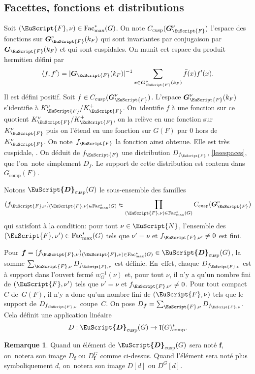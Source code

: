 \documentclass[JEP,XML,SOM,Unicode,francais]{cedram}
\let\mathcal \EuScript
\let\<\langle
\let\>\rangle
\newcommand{\comp}{\mathrm{comp}}
\newcommand{\cusp}{\mathrm{cusp}}
\newcommand{\Fac}{\mathrm{Fac}}
\DeclareMathOperator{\rI}{I}
\newcommand{\bmf}{\boldsymbol{f}}
\newcommand{\bG}{\boldsymbol{G}}
\newcommand{\cD}{\mathcal{D}}
\newcommand{\cF}{\mathcal{F}}
\newcommand{\cN}{\mathcal{N}}
\theoremstyle{plain}
\theoremstyle{definition}
\newtheorem*{rem*}{Remarque}
\begin{document}
\subsection{Facettes, fonctions et distributions}\label{facettesfonctions}
Soit $(\cF,\nu)\in \Fac_{\max}^*(G)$. On note $C_{\cusp}(\bG^{\nu}_{\cF})$ l'espace des fonctions sur $\bG^{\nu}_{\cF}(k_{F})$ qui sont invariantes par conjugaison par $\bG_{\cF}(k_{F})$ et qui sont cuspidales. On munit cet espace du produit hermitien défini par
\[
\<f,f'\>=\vert \bG_{\cF}(k_{F})\vert ^{-1}\sum_{x\in \bG^{\nu}_{\cF}(k_{F})}\bar{f}(x)f'(x).
\]
Il est défini positif. Soit $f\in C_{\cusp}(\bG^{\nu}_{\cF})$. L'espace $\bG_{\cF}^{\nu}(k_{F})$ s'identifie à $K_{\cF}^{\nu}/K_{\cF}^+$. On~identifie $f$ à une fonction sur ce quotient $K_{\cF}^{\nu}/K_{\cF}^+$, on la relève en une fonction sur~$K_{\cF}^{\nu}$ puis on l'étend en une fonction sur $G(F)$ par $0$ hors de $K_{\cF}^{\nu}$. On note~$f_{\cF}$ la fonction ainsi obtenue. Elle est très cuspidale, \cf \cite[Lem.\,10]{W2}. On déduit de $f_{\cF}$ une distribution $D_{f_{\cF}}$, \cf \ref{lesespaces}, que l'on~note simplement $D_{f}$. Le support de cette distribution est contenu dans $G_{\comp}(F)$.

Notons $\boldsymbol{\cD}_{\cusp}(G)$ le sous-ensemble des familles
\[
(f_{\cF,\nu})_{(\cF,\nu)\in \Fac^*_{\max}(G)}\in \prod_{(\cF,\nu)\in \Fac^*_{\max}(G)}C_{\cusp}(\bG^{\nu}_{\cF})
\]
qui satisfont à la condition: pour tout $\nu\in \cN$, l'ensemble des $(\cF,\nu')\in \Fac^*_{\max}(G)$ tels que $\nu'=\nu$ et $f_{\cF,\nu'}\neq0$ est fini.

Pour $\bmf=(f_{\cF,\nu})_{(\cF,\nu)\in \Fac^*_{\max}(G)}\in \boldsymbol{\cD}_{\cusp}(G)$, la somme $\sum_{\cF,\nu}D_{f_{\cF,\nu}}$ est définie. \hbox{En~effet}, chaque $D_{f_{\cF,\nu}}$ est à support dans l'ouvert fermé $w_{G}^{-1}(\nu)$ et, pour tout $\nu$, il n'y a qu'un nombre fini de $(\cF,\nu')$ tels que $\nu'=\nu$ et $f_{\cF,\nu'}\neq0$. Pour tout compact~$C$ de~$G(F)$, il n'y a donc qu'un nombre fini de $(\cF,\nu)$ tels que le support de $D_{f_{\cF,\nu}}$ coupe~$C$. On pose $D_{\bmf}=\sum_{\cF,\nu}D_{f_{\cF,\nu}}$. Cela définit une application linéaire
\[
D: \boldsymbol{\cD}_{\cusp}(G)\to \rI(G)_{\comp}^*.
\]

\begin{rem*}
Quand un élément de $\boldsymbol{\cD}_{\cusp}(G)$ sera noté $\bmf$, on~notera son image $D_{\bmf}$ ou $D^G_{\bmf}$ comme ci-dessus. Quand l'élément sera noté plus symboliquement $d$, on~notera son image $D[d]$ ou $D^G[d]$.
\end{rem*}
\end{document}
